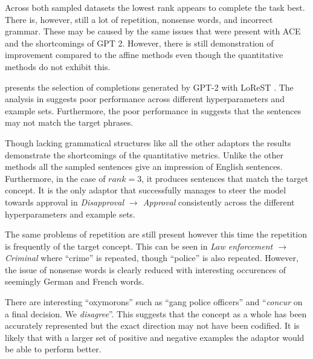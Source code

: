 Across both sampled datasets the lowest rank appears to complete the task best.
There is, however, still a lot of repetition, nonsense words, and incorrect grammar.
These may be caused by the same issues that were present with ACE and the shortcomings of GPT 2.
However, there is still demonstration of improvement compared to the affine methods even though the quantitative methods do not exhibit this.




 presents the selection of completions generated by GPT-2 with LoReST \citep{steering-clear}.
The analysis in  suggests poor performance across different hyperparameters and example sets.
Furthermore, the poor performance in  suggests that the sentences may not match the target phrases.

Though lacking grammatical structures like all the other adaptors the results demonstrate the shortcomings of the quantitative metrics.
Unlike the other methods all the sampled sentences give an impression of English sentences.
Furthermore, in the case of $rank = 3$, it produces sentences that match the target concept.
It is the only adaptor that successfully manages to steer the model towards approval in \emph{Disapproval $\to$ Approval} consistently across the different hyperparameters and example sets.

The same problems of repetition are still present however this time the repetition is frequently of the target concept.
This can be seen in \emph{Law enforcement $\to$ Criminal} where ``crime'' is repeated, though ``police'' is also repeated.
However, the issue of nonsense words is clearly reduced with interesting occurences of seemingly German and French words.

There are interesting ``oxymorons'' such as ``gang police officers'' and ``\emph{concur} on a final decision. We \emph{disagree}''.
This suggests that the concept as a whole has been accurately represented but the exact direction may not have been codified.
It is likely that with a larger set of positive and negative examples the adaptor would be able to perform better.
